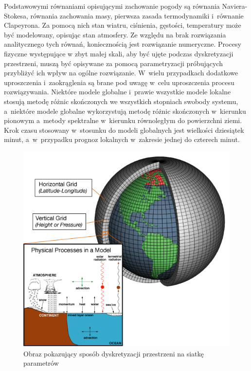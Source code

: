 Podstawowymi równaniami opisującymi zachowanie pogody są równania Naviera-Stokesa, równania zachowania
masy, pierwsza zasada termodynamiki i~równanie Clapeyrona. Za pomocą nich stan wiatru, ciśnienia,
gęstości, temperatury może być modelowany, opisując stan atmosfery. Ze względu na brak rozwiązania
analitycznego tych równań, koniecznością jest rozwiązanie numeryczne. Procesy fizyczne występujące
w zbyt małej skali, aby być ujęte podczas dyskretyzacji przestrzeni, muszą być opisywane za pomocą
parametryzacji próbujących przybliżyć ich wpływ na ogólne rozwiązanie. W~wielu przypadkach 
dodatkowe uproszczenia i~zaokrąglenia są brane pod uwagę w~celu uproszczenia procesu
rozwiązywania. Niektóre modele globalne i~prawie wszystkie modele lokalne stosują 
metodę różnic skończonych we wszystkich stopniach swobody systemu, a~niektóre modele globalne
wykorzystują metodę różnic skończonych w~kierunku pionowym a~metody spektralne w~kierunku równoległym
do powierzchni ziemi. Krok czasu stosowany w~stosunku do modeli globalnych jest wielkości dziesiątek
minut, a~w~przypadku prognoz lokalnych w~zakresie jednej do czterech minut.

\begin{figure}[H]
    \centering
    \includegraphics[width=\textwidth]{images/grid.png}
    \caption[opis dla siatki]{Obraz pokazujący sposób dyskretyzacji przestrzeni
    na siatkę parametrów\footnotemark}
    \label{grid}
\end{figure}

